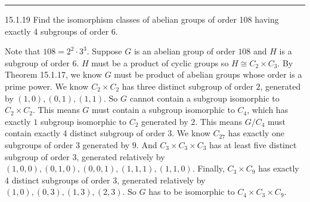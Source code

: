\documentclass[a4paper, 12pt]{article}
\begin{document}
\noindent\rule{7in}{2.8pt}
\begin{problem}{15.1.19}
Find the isomorphism classes of abelian groups of order 108 having exactly 4 subgroups of order \(6\).
\end{problem}
\begin{solution}
Note that \(108=2^2\cdot 3^3\). Suppose \(G\) is an abelian group of order \(108\) and \(H\) is a subgroup of order \(6\). \(H\) must be a product of cyclic groups so \(H\cong C_2\times C_3\). By Theorem 15.1.17, we know 
\(G\) must be product of abelian groups whose order is a prime power. We know \(C_2\times C_2\) has three distinct subgroup of order \(2\), generated by \((1,0),(0,1),(1,1)\). So \(G\) cannot contain a subgroup isomorphic to 
\(C_2\times C_2\). This means \(G\) must contain a subgroup isomorphic to \(C_4\), which has exactly \(1\) subgroup isomorphic to \(C_2\) generated by \(2\). This means \(G/C_4\) must contain exactly 4 distinct subgroup of order \(3\). 
We know \(C_{27}\) has exactly one subgroups of order \(3\) generated by \(9\). And \(C_3\times C_3\times C_3\) has at least five distinct subgroup of order 3, generated relatively by \((1,0,0),(0,1,0),(0,0,1),(1,1,1),(1,1,0)\). Finally, \(C_3\times C_9\) 
has exactly 4 distinct subgroups of order 3, generated relatively by \((1,0),(0,3),(1,3),(2,3)\). So \(G\) has to be isomorphic to \(C_4\times C_3\times C_9\).
\end{solution}
\end{document}
